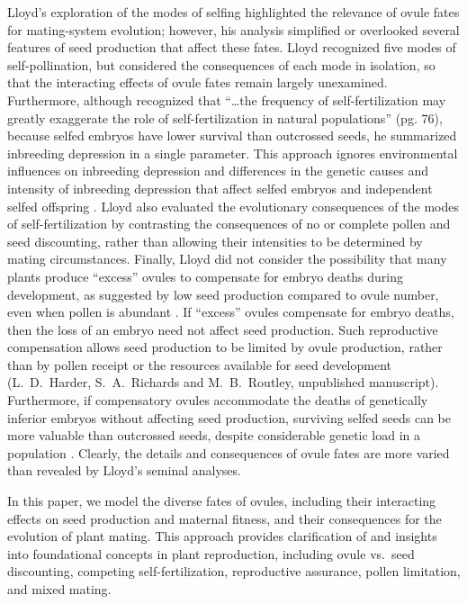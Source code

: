 \documentclass[letterpaper,titlepage]{scrartcl}
\newcommand{\OFMixedMating}{L.~D.~Harder, S.~A.~Richards and
  M.~B.~Routley, unpublished manuscript}
\begin{document}
Lloyd's \citeyearpar{Lloyd79,Lloyd92a} exploration of the modes of
selfing highlighted the relevance of ovule fates for mating-system
evolution; however, his analysis simplified or overlooked several
features of seed production that affect these fates. Lloyd recognized
five modes of self-pollination, but considered the consequences of
each mode in isolation, so that the interacting effects of ovule fates
remain largely unexamined. Furthermore, although \citet{Lloyd79}
recognized that “…the frequency of self-fertilization may greatly
exaggerate the role of self-fertilization in natural populations”
(pg. 76), because selfed embryos have lower survival than outcrossed
seeds, he summarized inbreeding depression in a single parameter. This
approach ignores environmental influences on inbreeding depression and
differences in the genetic causes and intensity of inbreeding
depression that affect selfed embryos and independent selfed offspring
\citep{Husband96}. Lloyd also evaluated the evolutionary consequences
of the modes of self-fertilization by contrasting the consequences of
no or complete pollen and seed discounting, rather than allowing their
intensities to be determined by mating circumstances. Finally, Lloyd
did not consider the possibility that many plants produce “excess”
ovules to compensate for embryo deaths during development, as
suggested by low seed production compared to ovule number, even when
pollen is abundant \citetext{{\fref}~\ref{fig:empirical};
  \citealp{Wiens84,Wiens89}}. If ``excess'' ovules compensate for
embryo deaths, then the loss of an embryo need not affect seed
production. Such reproductive compensation allows seed production to
be limited by ovule production, rather than by pollen receipt or the
resources available for seed development
({\OFMixedMating}). Furthermore, if compensatory ovules accommodate
the deaths of genetically inferior embryos without affecting seed
production, surviving selfed seeds can be more valuable than
outcrossed seeds, despite considerable genetic load in a population
\citetext{\citealp{Porcher05}; {\OFMixedMating}}. Clearly, the details
and consequences of ovule fates are more varied than revealed by
Lloyd's \citeyearpar{Lloyd79,Lloyd92a} seminal analyses.

In this paper, we model the diverse fates of ovules, including their
interacting effects on seed production and maternal fitness, and their
consequences for the evolution of plant mating. This approach provides
clarification of and insights into foundational concepts in plant
reproduction, including ovule vs.~seed discounting, competing
self-fertilization, reproductive assurance, pollen limitation, and
mixed mating.
\end{document}
